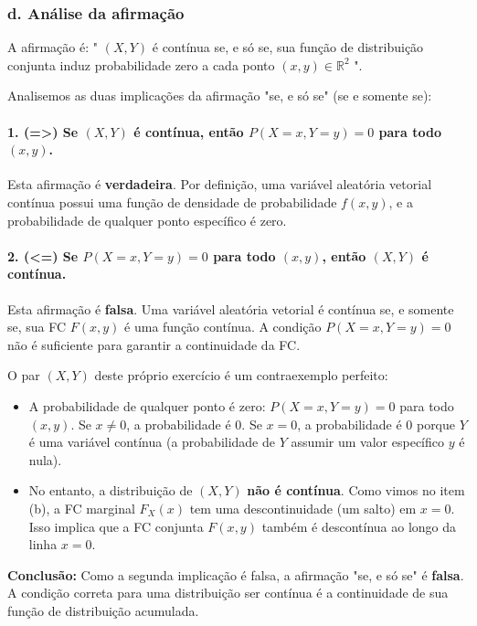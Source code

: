 \documentclass[12pt]{article}
\begin{document}
\subsubsection*{d. Análise da afirmação}
A afirmação é: " $(X,Y)$ é contínua se, e só se, sua função de distribuição conjunta induz probabilidade zero a cada ponto $(x,y) \in \mathbb{R}^2$ ".

Analisemos as duas implicações da afirmação "se, e só se" (se e somente se):

\paragraph{1. (=>) Se $(X,Y)$ é contínua, então $P(X=x, Y=y)=0$ para todo $(x,y)$.}
Esta afirmação é \textbf{verdadeira}. Por definição, uma variável aleatória vetorial contínua possui uma função de densidade de probabilidade $f(x,y)$, e a probabilidade de qualquer ponto específico é zero.

\paragraph{2. (<=) Se $P(X=x, Y=y)=0$ para todo $(x,y)$, então $(X,Y)$ é contínua.}
Esta afirmação é \textbf{falsa}. Uma variável aleatória vetorial é contínua se, e somente se, sua FC $F(x,y)$ é uma função contínua. A condição $P(X=x, Y=y)=0$ não é suficiente para garantir a continuidade da FC.

O par $(X,Y)$ deste próprio exercício é um contraexemplo perfeito:
\begin{itemize}
    \item A probabilidade de qualquer ponto é zero: $P(X=x, Y=y) = 0$ para todo $(x,y)$. Se $x \ne 0$, a probabilidade é 0. Se $x=0$, a probabilidade é 0 porque $Y$ é uma variável contínua (a probabilidade de $Y$ assumir um valor específico $y$ é nula).
    \item No entanto, a distribuição de $(X,Y)$ \textbf{não é contínua}. Como vimos no item (b), a FC marginal $F_X(x)$ tem uma descontinuidade (um salto) em $x=0$. Isso implica que a FC conjunta $F(x,y)$ também é descontínua ao longo da linha $x=0$.
\end{itemize}

\textbf{Conclusão:} Como a segunda implicação é falsa, a afirmação "se, e só se" é \textbf{falsa}. A condição correta para uma distribuição ser contínua é a continuidade de sua função de distribuição acumulada. \hfill \qedsymbol
\end{document}
